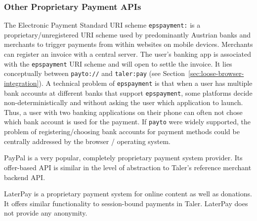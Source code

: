 \subsubsection{Other Proprietary Payment APIs}
The Electronic Payment Standard URI scheme \texttt{epspayment:} is a
proprietary/unregistered URI scheme used by predominantly Austrian banks and
merchants to trigger payments from within websites on mobile devices.
Merchants can register an invoice with a central server.  The user's banking
app is associated with the \texttt{epspayment} URI scheme and will open to
settle the invoice.  It lies conceptually between \texttt{payto://} and
\texttt{taler:pay} (see Section~\ref{sec:loose-browser-integration}).  A
technical problem of \texttt{epspayment} is that when a user has multiple bank
accounts at different banks that support \texttt{epspayment}, some platforms
decide non-deterministically and without asking the user which application to
launch.  Thus, a user with two banking applications on their phone can often not
chose which bank account is used for the payment.  If \texttt{payto} were
widely supported, the problem of registering/choosing bank accounts for payment
methods could be centrally addressed by the browser / operating system.

PayPal is a very popular, completely proprietary payment system provider.  Its offer-based
API is similar in the level of abstraction to Taler's reference merchant backend API.

LaterPay is a proprietary payment system for online content as well as
donations.  It offers similar functionality to session-bound payments in Taler.
LaterPay does not provide any anonymity.


